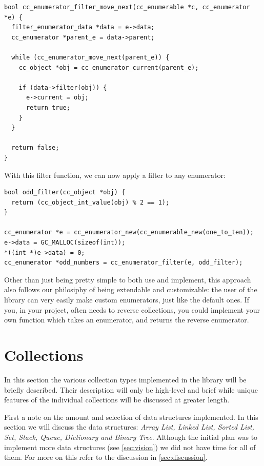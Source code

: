 \documentclass[table]{ituthesis}
\begin{document}
\begin{lstlisting}[label=cc_enumerator-filter-move_next,caption=Custom enumerator filter]
bool cc_enumerator_filter_move_next(cc_enumerable *c, cc_enumerator *e) {
  filter_enumerator_data *data = e->data;
  cc_enumerator *parent_e = data->parent;

  while (cc_enumerator_move_next(parent_e)) {
    cc_object *obj = cc_enumerator_current(parent_e);
  
    if (data->filter(obj)) {
      e->current = obj;
      return true;
    }
  }

  return false;
}
\end{lstlisting}	    

	With this filter function, we can now apply a filter to any enumerator:

\begin{lstlisting}[label=cc_enumerator-custom-filter,caption=Custom filter example]
bool odd_filter(cc_object *obj) {
  return (cc_object_int_value(obj) % 2 == 1);
}

cc_enumerator *e = cc_enumerator_new(cc_enumerable_new(one_to_ten));
e->data = GC_MALLOC(sizeof(int));
*((int *)e->data) = 0;
cc_enumerator *odd_numbers = cc_enumerator_filter(e, odd_filter);
\end{lstlisting}	

	Other than just being pretty simple to both use and implement, this approach also follows our philosiphy of being extendable and customizable: the user of the library can very easily make custom enumerators, just like the default ones. If you, in your project, often needs to reverse collections, you could implement your own function which takes an enumerator, and returns the reverse enumerator.

\section{Collections}\label{sec:impl_collections}
	In this section the various collection types implemented in the library will be briefly described. Their description will only be high-level and brief while unique features of the individual collections will be discussed at greater length.

	First a note on the amount and selection of data structures implemented. In this section we will discuss the data structures: \textit{Array List, Linked List, Sorted List, Set, Stack, Queue, Dictionary and Binary Tree}. Although the initial plan was to implement more data structures (see \autoref{sec:vision}) we did not have time for all of them. For more on this refer to the discussion in \autoref{sec:discussion}.
\end{document}
